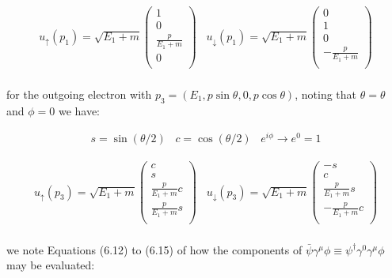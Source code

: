 \documentclass[11pt]{article}
\theoremstyle{definition}
\begin{document}
\begin{align}
    u_{\uparrow}(p_1) =
    \sqrt{E_1+m}
    \begin{pmatrix}
        1\\
        0\\
        \frac{p}{E_1+m}\\
        0\\
    \end{pmatrix} \;\;\;
    u_{\downarrow}(p_1) =
    \sqrt{E_1+m}
    \begin{pmatrix}
        0\\
        1\\
        0\\
        -\frac{p}{E_1+m} \\
    \end{pmatrix}\\
\end{align}


for the outgoing electron with $p_3 = (E_1, p\sin\theta, 0, p\cos\theta)$, noting that $\theta=\theta$ and $\phi=0$ we have:

\begin{align}
    s = \sin(\theta/2) \;\;\;
    c = \cos(\theta/2) \;\;\;
    e^{i\phi} \to e^{0} = 1
\end{align}

\begin{align}
    u_{\uparrow}(p_3) =
    \sqrt{E_1+m}
    \begin{pmatrix}
        c\\
        s\\
        \frac{p}{E_1+m}c\\
        \frac{p}{E_1+m}s\\
    \end{pmatrix} \;\;\;
    u_{\downarrow}(p_3) =
    \sqrt{E_1+m}
    \begin{pmatrix}
        -s\\
        c\\
        \frac{p}{E_1+m}s\\
        -\frac{p}{E_1+m}c\\
    \end{pmatrix}\\
\end{align}

we note Equations (6.12) to (6.15) of how the components of $\bar{\psi}\gamma^{\mu}\phi \equiv \psi^{\dagger}\gamma^{0}\gamma^{\mu}\phi$ may be evaluated:
\end{document}
